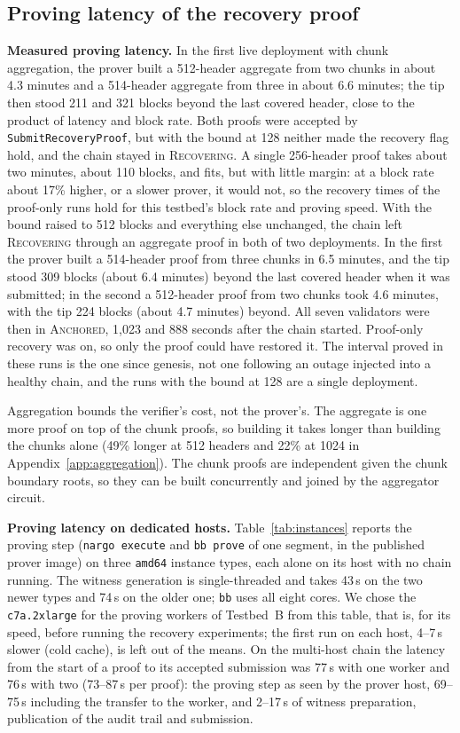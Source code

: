 \subsection*{Proving latency of the recovery proof}

\textbf{Measured proving latency.} In the first live deployment with chunk
aggregation, the prover built a 512-header aggregate from two chunks in about
4.3 minutes and a 514-header aggregate from three in about 6.6 minutes; the
tip then stood 211 and 321 blocks beyond the last covered header, close to the
product of latency and block rate. Both proofs were accepted by
\texttt{SubmitRecoveryProof}, but with the bound at 128 neither made the
recovery flag hold, and the chain stayed in \textsc{Recovering}. A single
256-header proof takes about two minutes, about 110 blocks, and fits, but
with little margin: at a block rate about 17\% higher, or a slower prover, it
would not, so the recovery times of the proof-only runs hold for this
testbed's block rate and proving speed. With the bound raised to 512 blocks and
everything else unchanged, the chain left \textsc{Recovering} through an
aggregate proof in both of two deployments. In the first the prover built a
514-header proof from three chunks in 6.5 minutes, and the tip stood 309
blocks (about 6.4 minutes) beyond the last covered header when it was
submitted; in the second a 512-header proof from two chunks took 4.6 minutes,
with the tip 224 blocks (about 4.7 minutes) beyond. All seven validators were
then in \textsc{Anchored}, 1{,}023 and 888 seconds after the chain started.
Proof-only recovery was on, so only the proof could have restored it. The
interval proved in these runs is the one since genesis, not one following an
outage injected into a healthy chain, and the runs with the bound at 128 are a
single deployment.

Aggregation bounds the verifier's cost, not the prover's. The aggregate is one
more proof on top of the chunk proofs, so building it takes longer than building the
chunks alone (49\% longer at 512 headers and 22\% at 1024 in
Appendix~\ref{app:aggregation}). The chunk proofs are independent given the chunk
boundary roots, so they can be built concurrently and joined by the aggregator
circuit.

\textbf{Proving latency on dedicated hosts.} Table~\ref{tab:instances} reports the proving step
(\texttt{nargo execute} and \texttt{bb prove} of one segment, in the published prover image) on three
\texttt{amd64} instance types, each alone on its host with no chain running. The witness generation is
single-threaded and takes 43\,s on the two newer types and 74\,s on the older one; \texttt{bb} uses
all eight cores. We chose the \texttt{c7a.2xlarge} for the proving workers of Testbed~B from this table, that is,
for its speed, before running the recovery experiments; the first run on each host, 4--7\,s slower (cold cache), is
left out of the means. On the multi-host chain the latency from the start of a proof to its accepted submission was
77\,s with one worker and 76\,s with two (73--87\,s per proof): the proving step as seen by the prover host,
69--75\,s including the transfer to the worker, and 2--17\,s of witness preparation, publication of the audit
trail and submission.

